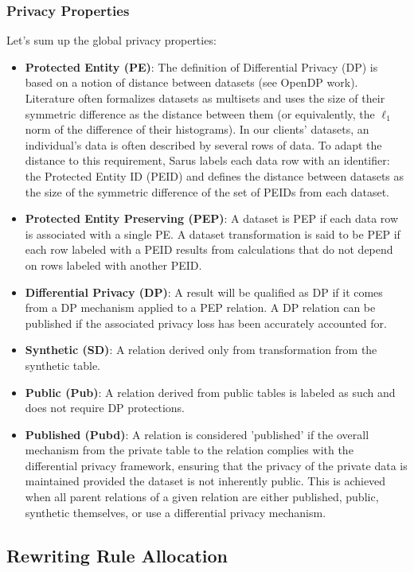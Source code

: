 \documentclass[letterpaper]{article} %
\begin{document}
\subsubsection{Privacy Properties}
\label{sec:global_privacy_properties}
Let's sum up the global privacy properties:
\begin{itemize}
    \item \textbf{Protected Entity (PE)}: The definition of Differential Privacy (DP) is based on a notion of distance between datasets (see OpenDP work). Literature often formalizes datasets as multisets and uses the size of their symmetric difference as the distance between them (or equivalently, the $\ell_1$ norm of the difference of their histograms). In our clients' datasets, an individual's data is often described by several rows of data. To adapt the distance to this requirement, Sarus labels each data row with an identifier: the Protected Entity ID (PEID) and defines the distance between datasets as the size of the symmetric difference of the set of PEIDs from each dataset.
    \item \textbf{Protected Entity Preserving (PEP)}: A dataset is PEP if each data row is associated with a single PE. A dataset transformation is said to be PEP if each row labeled with a PEID results from calculations that do not depend on rows labeled with another PEID.
    \item \textbf{Differential Privacy (DP)}: A result will be qualified as DP if it comes from a DP mechanism applied to a PEP relation. A DP relation can be published if the associated privacy loss has been accurately accounted for.
    \item \textbf{Synthetic (SD)}: A relation derived only from transformation from the synthetic table.
    \item \textbf{Public (Pub)}: A relation derived from public tables is labeled as such and does not require DP protections.
    \item \textbf{Published (Pubd)}: A relation is considered 'published' if the overall mechanism from the private table to the relation complies with the differential privacy framework, ensuring that the privacy of the private data is maintained provided the dataset is not inherently public. This is achieved when all parent relations of a given relation are either published, public, synthetic themselves, or use a differential privacy mechanism.
\end{itemize}

\subsection{Rewriting Rule Allocation}
\end{document}
